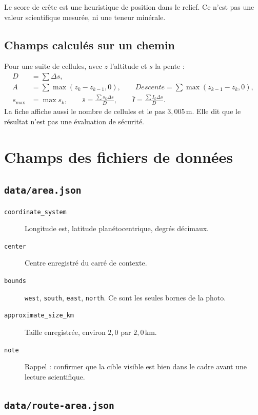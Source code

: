 \documentclass[11pt,a4paper]{article}
\begin{document}
Le score de crête est une heuristique de position dans le relief.
Ce n'est pas une valeur scientifique mesurée, ni une teneur minérale.

\subsection{Champs calculés sur un chemin}

Pour une suite de cellules, avec \(z\) l'altitude et \(s\) la pente :
\begin{align*}
D &= \sum \Delta s,\\
A &= \sum \max(z_{k}-z_{k-1},0),
\qquad
Descente = \sum \max(z_{k-1}-z_k,0),\\
s_{\mathrm{max}} &= \max s_k,
\qquad
\bar s = \frac{\sum s_k\Delta s}{D},
\qquad
\bar I = \frac{\sum I_k\Delta s}{D}.
\end{align*}
La fiche affiche aussi le nombre de cellules et le pas \(3{,}005\,\mathrm{m}\).
Elle dit que le résultat n'est pas une évaluation de sécurité.

\section{Champs des fichiers de données}

\subsection{\texttt{data/area.json}}

\begin{description}
\item[\texttt{coordinate\_system}] Longitude est, latitude planétocentrique, degrés décimaux.
\item[\texttt{center}] Centre enregistré du carré de contexte.
\item[\texttt{bounds}] \texttt{west}, \texttt{south}, \texttt{east}, \texttt{north}. Ce sont les seules bornes de la photo.
\item[\texttt{approximate\_size\_km}] Taille enregistrée, environ \(2{,}0\) par \(2{,}0\,\mathrm{km}\).
\item[\texttt{note}] Rappel : confirmer que la cible visible est bien dans le cadre avant une lecture scientifique.
\end{description}

\subsection{\texttt{data/route-area.json}}
\end{document}
